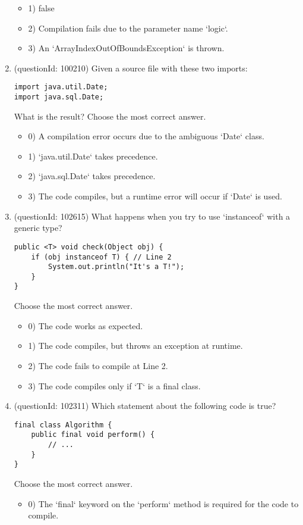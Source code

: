 \documentclass[12pt]{article}
\begin{document}
\begin{enumerate}[label=(\arabic*)]
\begin{itemize}
\item 1) false

\item 2) Compilation fails due to the parameter name `logic`.

\item 3) An `ArrayIndexOutOfBoundsException` is thrown.

\end{itemize}
\item (questionId: 100210) Given a source file with these two imports:
\begin{verbatim}
import java.util.Date;
import java.sql.Date;
\end{verbatim}
What is the result?
Choose the most correct answer. 
\begin{itemize}
\item 0) A compilation error occurs due to the ambiguous `Date` class.

\item 1) `java.util.Date` takes precedence.

\item 2) `java.sql.Date` takes precedence.

\item 3) The code compiles, but a runtime error will occur if `Date` is used.

\end{itemize}
\item (questionId: 102615) What happens when you try to use `instanceof` with a generic type?\begin{verbatim}
public <T> void check(Object obj) {
    if (obj instanceof T) { // Line 2
        System.out.println("It's a T!");
    }
}
\end{verbatim}
Choose the most correct answer. 
\begin{itemize}
\item 0) The code works as expected.

\item 1) The code compiles, but throws an exception at runtime.

\item 2) The code fails to compile at Line 2.

\item 3) The code compiles only if `T` is a final class.

\end{itemize}
\item (questionId: 102311) Which statement about the following code is true?\n\begin{verbatim}
final class Algorithm {
    public final void perform() {
        // ...
    }
}
\end{verbatim}
Choose the most correct answer. 
\begin{itemize}
\item 0) The `final` keyword on the `perform` method is required for the code to compile.


\end{itemize}
\end{enumerate}
\end{document}

